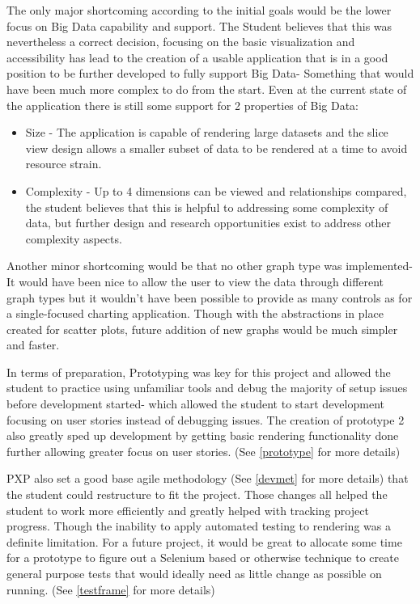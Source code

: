 The only major shortcoming according to the initial goals would be the lower focus on Big Data capability and support. The Student believes that this was nevertheless a correct decision, focusing on the basic visualization and accessibility has lead to the creation of a usable application that is in a good position to be further developed to fully support Big Data- Something that would have been much more complex to do from the start. Even at the current state of the application there is still some support for 2 properties \cite[]{6612229} of Big Data:
\begin{itemize}
    \item Size - The application is capable of rendering large datasets and the slice view design allows a smaller subset of data to be rendered at a time to avoid resource strain.
    \item Complexity -  Up to 4 dimensions can be viewed and relationships compared, the student believes that this is helpful to addressing some complexity of data, but further design and research opportunities exist to address other complexity aspects. \cite[]{6612229}
\end{itemize}

Another minor shortcoming would be that no other graph type was implemented- It would have been nice to allow the user to view the data through different graph types but it wouldn't have been possible to provide as many controls as for a single-focused charting application. Though with the abstractions in place created for scatter plots, future addition of new graphs would be much simpler and faster.

In terms of preparation, Prototyping was key for this project and allowed the student to practice using unfamiliar tools and debug the majority of setup issues before development started- which allowed the student to start development focusing on user stories instead of debugging issues. The creation of prototype 2 also greatly sped up development by getting basic rendering functionality done further allowing greater focus on user stories. (See \ref{prototype} for more details)

PXP also set a good base agile methodology (See \ref{devmet} for more details) that the student could restructure to fit the project. Those changes all helped the student to work more efficiently and greatly helped with tracking project progress. Though the inability to apply automated testing to rendering was a definite limitation. For a future project, it would be great to allocate some time for a prototype to figure out a Selenium based or otherwise technique to create general purpose tests that would ideally need as little change as possible on running. (See \ref{testframe} for more details)

